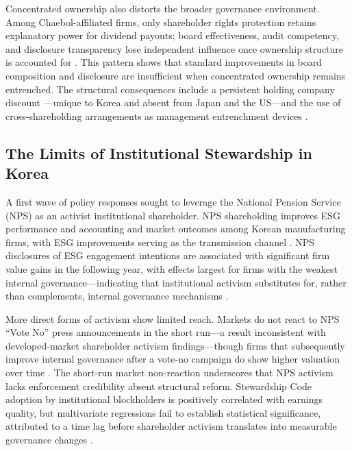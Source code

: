 Concentrated ownership also distorts the broader governance environment. Among Chaebol-affiliated firms, only shareholder rights protection retains explanatory power for dividend payouts; board effectiveness, audit competency, and disclosure transparency lose independent influence once ownership structure is accounted for \citep{njoku_corporate_governance_dividends}. This pattern shows that standard improvements in board composition and disclosure are insufficient when concentrated ownership remains entrenched. The structural consequences include a persistent holding company discount \citep{suh_holding_company_discount}---unique to Korea and absent from Japan and the US---and the use of cross-shareholding arrangements as management entrenchment devices \citep{park_cross_shareholdings_takeover}.

\subsection{The Limits of Institutional Stewardship in Korea}
A first wave of policy responses sought to leverage the National Pension Service (NPS) as an activist institutional shareholder. NPS shareholding improves ESG performance and accounting and market outcomes among Korean manufacturing firms, with ESG improvements serving as the transmission channel \citep{kim_nps_esg_manufacturing}. NPS disclosures of ESG engagement intentions are associated with significant firm value gains in the following year, with effects largest for firms with the weakest internal governance---indicating that institutional activism substitutes for, rather than complements, internal governance mechanisms \citep{lee_esg_nps_firm_value}.

More direct forms of activism show limited reach. Markets do not react to NPS ``Vote No'' press announcements in the short run---a result inconsistent with developed-market shareholder activism findings---though firms that subsequently improve internal governance after a vote-no campaign do show higher valuation over time \citep{kim_nps_governance_firm_value}. The short-run market non-reaction underscores that NPS activism lacks enforcement credibility absent structural reform. Stewardship Code adoption by institutional blockholders is positively correlated with earnings quality, but multivariate regressions fail to establish statistical significance, attributed to a time lag before shareholder activism translates into measurable governance changes \citep{park_stewardship_code_earnings}.

